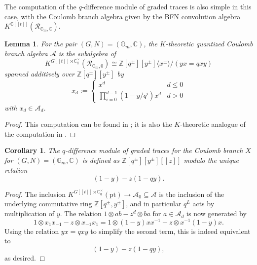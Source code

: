 \documentclass[reqno]{amsart}
\numberwithin{equation}{section}
\numberwithin{equation}{section}
\numberwithin{equation}{section}
\newtheorem{cor}[thm]{Corollary}
\newtheorem{lemma}[thm]{Lemma}
\theoremstyle{definition}
\theoremstyle{remark}
\theoremstyle{remark}
\begin{document}
The computation of the $q$-difference module of graded traces is also simple in this case, with the Coulomb branch algebra given by the BFN convolution algebra $K^{\mathbb{G}[\![t]\!]} (\mathcal{R}_{\mathbb{G}_m, \mathbb{C}})$.

\begin{lemma}\label{lem:coulomb-algebra-computation-rank1}
    For the pair $(G, N) = (\mathbb{G}_m, \mathbb{C})$, the $K$-theoretic quantized Coulomb branch algebra $\mathcal{A}$ is the subalgebra of
    \begin{equation}
        K^{G[\![t]\!] \rtimes \mathbb{C}^\times_q}(\mathcal{R}_{\mathbb{G}_m, 0}) \cong \mathbb{Z}[q^\pm ][y^\pm]\langle x^\pm \rangle/(yx=qxy)
    \end{equation}
    spanned additively over $\mathbb{Z}[q^\pm][y^\pm]$ by
    \begin{equation}
        x_d := \begin{cases}
            x^{d} & d \le 0 \\ \prod_{i=0}^{d-1} (1-y/q^i) x^d & d >0 
        \end{cases}
    \end{equation}
    with $x_d \in \mathcal{A}_d$.
\end{lemma}
\begin{proof}
    This computation can be found in \cite[Example 4.4]{lonergan}; it is also the $K$-theoretic analogue of the computation in \cite[4(ii)]{BFN2}.
\end{proof}

\begin{cor}\label{cor:trace-qdiff-computation-rank1}
    The $q$-difference module of graded traces for the Coulomb branch $X$  for $(G,N) = (\mathbb{G}_m, \mathbb{C})$ is defined as $\mathbb{Z}[q^\pm][y^\pm][\![z]\!]$ modulo the unique relation
     \begin{equation}
        (1-y) - z (1- qy).
    \end{equation}
\end{cor}
\begin{proof}
    The inclusion $K^{G[\![t]\!] \rtimes \mathbb{C}^\times_q}(\mathrm{pt}) \to \mathcal{A}_0 \subseteq \mathcal{A}$ is the inclusion of the underlying commutative ring $\mathbb{Z}[q^\pm, y^\pm]$, and in particular $q^L$ acts by multiplication of $y$. The relation $1 \otimes ab - z^d \otimes ba$ for $a \in \mathcal{A}_d$ is now generated by
    \begin{equation}
     1 \otimes x_1 x_{-1} - z \otimes x_{-1} x_1 =     1\otimes (1-y)xx^{-1} - z \otimes x^{-1}(1-y) x.
    \end{equation}
    Using the relation $yx = qxy$ to simplify the second term, this is indeed equivalent to
    \begin{equation}
        (1-y) - z(1- qy),
    \end{equation}
    as desired. 
\end{proof}
\end{document}
